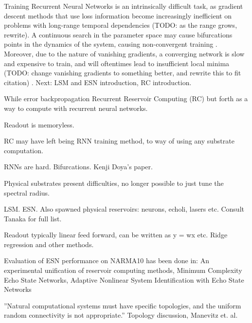 Training Recurrent Neural Networks is an intrinsically difficult task, as
gradient descent methods that use loss information become increasingly
inefficient on problems with long-range temporal dependencies (TODO: as the
range grows, rewrite).  A continuous search in the parameter space may cause
bifurcations points in the dynamics of the system, causing non-convergent
training \cite{doya_bifurcations_nodate}. Moreover, due to the nature of
vanishing gradients, a converging network is slow and expensive to train, and
will oftentimes lead to insufficient local minima (TODO: change vanishing
gradients to something better, and rewrite this to fit citation)
\cite{bengio_learning_1994}. Next: LSM and ESN introduction, RC introduction.

While error backpropagation Recurrent Reservoir Computing (RC) but forth as a
way to compute with recurrent neural networks.

Readout is memoryless.

RC may have left being RNN training method, to way of using any substrate
computation.

RNNs are hard. Bifurcations. Kenji Doya's paper.

Physical substrates present difficulties, no longer possible to just tune the
spectral radius.

LSM. ESN. Also spawned physical reservoirs: neurons, echoli, lasers etc. Consult
Tanaka for full list.

Readout typically linear feed forward, can be written as y = wx etc. Ridge
regression and other methods.

Evaluation of ESN performance on NARMA10 has been done in: An experimental unification of reservoir computing methods, Minimum Complexity Echo State Networks, Adaptive Nonlinear System Identification with Echo State Networks

''Natural computational systems must have specific topologies, and the uniform
random connectivity is not appropriate.'' Topology discussion, Manevitz et. al.

